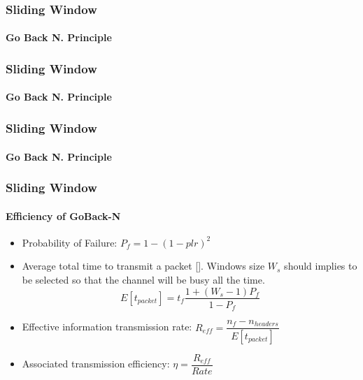 \begin{frame}		
	\frametitle{Sliding Window}
	\framesubtitle{Go Back N. Principle}
		\begin{figure}[H]
		\end{figure}
\end{frame}

\begin{frame}		
	\frametitle{Sliding Window}
	\framesubtitle{Go Back N. Principle}
	\begin{figure}[H]
	\end{figure}
\end{frame}

\begin{frame}		
	\frametitle{Sliding Window}
	\framesubtitle{Go Back N. Principle}
	\begin{figure}[H]
	\end{figure}
\end{frame}

\begin{frame}		
	\frametitle{Sliding Window}
	\framesubtitle{Efficiency of GoBack-N}
	\begin{itemize}
		\item Probability of Failure\footnotemark:
		$P_f = 1 - (1-plr)^2$
		\item Average total time to transmit a packet [\cite{1}]. Windows size $W_s$ should implies to be selected so that the channel will be busy all the time.
		$$E[t_{packet}] = t_f \dfrac{1 + (W_s - 1) P_f}{1-P_f}$$
		\item Effective information transmission rate: $R_{eff} =\dfrac{n_f - n_{headers}}{E[t_{packet}]} $
		\item Associated transmission efficiency: $\eta = \dfrac{R_{eff}}{Rate}$
		

		
	\end{itemize}
\end{frame}